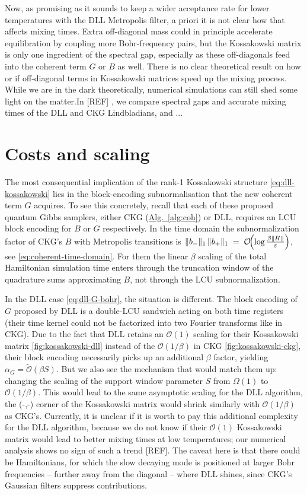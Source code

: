Now, as promising as it sounds to keep a wider acceptance rate for lower temperatures with the DLL Metropolis filter, a priori it is not clear how that affects mixing times. Extra off-diagonal mass could in principle accelerate equilibration by coupling more Bohr-frequency pairs, but the Kossakowski matrix is only one ingredient of the spectral gap, especially as these off-diagonals feed into the coherent term $G$ or $B$ as well. There is no clear theoretical result on how or if off-diagonal terms in Kossakowski matrices speed up the mixing process. While we are in the dark theoretically, numerical simulations can still shed some light on the matter.In [REF] , we compare spectral gaps and accurate mixing times of the DLL and CKG Lindbladians, and ... 

\smallskip
\section{Costs and scaling}
The most consequential implication of the rank-1 Kossakowski structure \eqref{eq:dll-kossakowski} lies in the block-encoding subnormalisation that the new coherent term $G$ acquires. To see this concretely, recall that each of these proposed quantum Gibbs samplers, either CKG (\hyperref[alg:coh]{Alg.~\ref*{alg:coh}}) or DLL, requires an LCU block encoding for $B$ or $G$ respectively. In the time domain the subnormalization factor of CKG's $B$ with Metropolis transitions is $\|b_-\|_1\,\|b_+\|_1 \;=\; \mathcal{O}\!\Bigl(\log\frac{\beta\|H\|}{\varepsilon}\Bigr)$, see \eqref{eq:coherent-time-domain}. For them the linear $\beta$ scaling of the total Hamiltonian simulation time enters through the truncation window of the quadrature sums approximating $B$, not through the LCU subnormalization. 

In the DLL case \eqref{eq:dll-G-bohr}, the situation is different. The block encoding of $G$ proposed by DLL is a double-LCU sandwich acting on both time registers (their time kernel could not be factorized into two Fourier transforms like in CKG). Due to the fact that DLL retains an $\mathcal{O}(1)$ scaling for their Kossakowski matrix \eqref{fig:kossakowski-dll} instead of the $\mathcal{O}(1 / \beta)$ in CKG \eqref{fig:kossakowski-ckg}, their block encoding necessarily picks up an additional $\beta$ factor, yielding $\alpha_G = \tilde{\mathcal{O}}(\beta S)$. But we also see the mechanism that would match them up: changing the scaling of the support window parameter $S$ from $\Omega(1)$ to $\mathcal{O}(1 / \beta)$. This would lead to the same asymptotic scaling for the DLL algorithm, the (-,-) corner of the Kossakowski matrix would shrink similarly with $\mathcal{O}(1/\beta)$ as CKG's. Currently, it is unclear if it is worth to pay this additional complexity for the DLL algorithm, because we do not know if their $\mathcal{O}(1)$ Kossakowski matrix would lead to better mixing times at low temperatures; our numerical analysis shows no sign of such a trend [REF].  The caveat here is that there could be Hamiltonians, for which the slow decaying mode is positioned at larger Bohr frequencies -- further away from the diagonal -- where DLL shines, since CKG's Gaussian filters suppress contributions.


